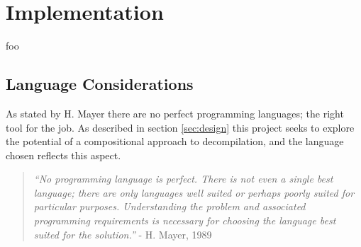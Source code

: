 
\section{Implementation}
\label{sec:implementation}





foo



\subsection{Language Considerations}

As stated by H. Mayer there are no perfect programming languages; the right tool for the job. As described in section \ref{sec:design} this project seeks to explore the potential of a compositional approach to decompilation, and the language chosen reflects this aspect.

\begin{quote}
	\textit{``No programming language is perfect. There is not even a single best language; there are only languages well suited or perhaps poorly suited for particular purposes. Understanding the problem and associated programming requirements is necessary for choosing the language best suited for the solution.''} - H. Mayer, 1989 \cite{no_perfect_lang}
\end{quote}

